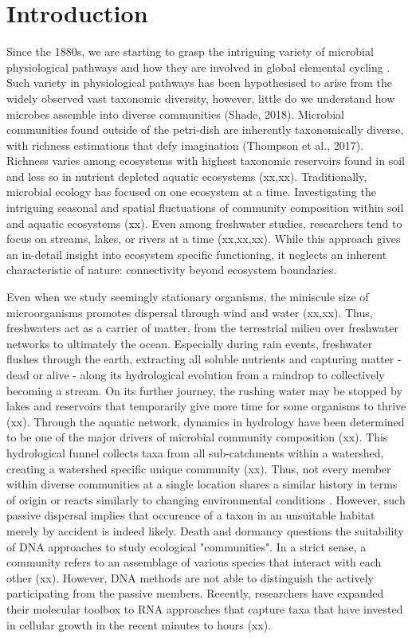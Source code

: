 \documentclass[12pt,a4paper]{article} %
\begin{document}
\section*{Introduction}
Since the 1880s, we are starting to grasp the intriguing variety of microbial physiological pathways and how they are involved in global elemental cycling \citep{Caumette2015}. Such variety in physiological pathways has been hypothesised to arise from the widely observed vast taxonomic diversity, however, little do we understand how microbes assemble into diverse communities (Shade, 2018). Microbial communities found outside of the petri-dish are inherently taxonomically diverse, with richness estimations that defy
imagination (Thompson et al., 2017). Richness varies among ecosystems with highest taxonomic reservoirs found in soil and less so in nutrient depleted aquatic ecosystems (xx,xx). Traditionally, microbial ecology has focused on one ecosystem at a time. Investigating the intriguing seasonal and spatial fluctuations of community composition within soil and aquatic ecosystems (xx). Even among freshwater studies, researchers tend to focus on streams, lakes, or rivers at a time (xx,xx,xx). While this approach gives an in-detail insight into ecosystem specific functioning, it neglects an inherent characteristic of nature: connectivity beyond ecosystem boundaries. 

Even when we study seemingly stationary organisms, the miniscule size of microorganisms promotes dispersal through wind and water (xx,xx). Thus, freshwaters act as a carrier of matter, from the terrestrial milieu over freshwater networks to ultimately the ocean. Especially during rain events, freshwater flushes through the earth, extracting all soluble nutrients and capturing matter - dead or alive - along its hydrological evolution from a raindrop to collectively becoming a stream. On its further journey, the rushing water may be stopped by lakes and reservoirs that temporarily give more time for some organisms to thrive (xx). Through the aquatic network, dynamics in hydrology have been determined to be one of the major drivers of microbial community composition (xx). This hydrological funnel collects taxa from all sub-catchments within a watershed, creating a watershed specific unique community (xx). Thus, not every member within diverse communities at a single location shares a similar history in terms of origin \citep{Nino-Garcia2016, Comte2017} or reacts similarly to changing environmental conditions \citep{Fierer2007}. However, such passive dispersal implies that occurence of a taxon in an unsuitable habitat merely by accident is indeed likely. Death and dormancy questions the suitability of DNA approaches to study ecological "communities". In a strict sense, a community refers to an assemblage of various species that interact with each other (xx). However, DNA methods are not able to distinguish the actively participating from the passive members. Recently, researchers have expanded their molecular toolbox to RNA approaches that capture taxa that have invested in cellular growth in the recent minutes to hours (xx).
\end{document}
